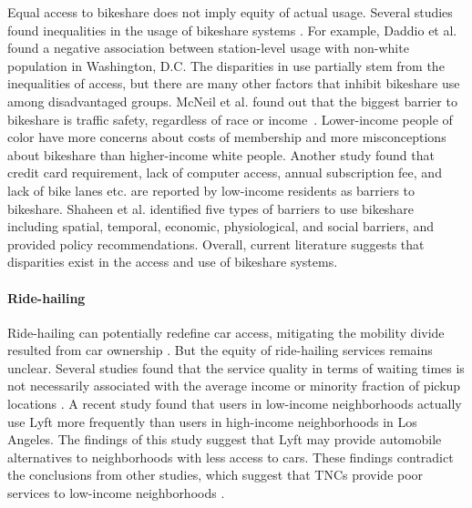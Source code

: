 \documentclass[11pt]{article}
\begin{document}
Equal access to bikeshare does not imply equity of actual usage. Several studies found inequalities in the usage of bikeshare systems \cite{daddio2012maximizing, rixey2013station}. For example, Daddio et al. \cite{daddio2012maximizing} found a negative association between station-level usage with non-white population in Washington, D.C. The disparities in use partially stem from the inequalities of access, but there are many other factors that inhibit bikeshare use among disadvantaged groups. McNeil et al. found out that the biggest barrier to bikeshare is traffic safety, regardless of race or income~\cite{mcneil2017breaking}. Lower-income people of color have more concerns about costs of membership and more misconceptions about bikeshare than higher-income white people. Another study \cite{kretman2011bringing} found that credit card requirement, lack of computer access, annual subscription fee, and lack of bike lanes etc. are reported by low-income residents as barriers to bikeshare. Shaheen et al. \cite{shaheen2017travel} identified five types of barriers to use bikeshare including spatial, temporal, economic, physiological, and social barriers, and provided policy recommendations. Overall, current literature suggests that disparities exist in the access and use of bikeshare systems. 

\paragraph{Ride-hailing}
Ride-hailing can potentially redefine car access, mitigating the mobility divide resulted from car ownership \cite{brown2018ridehail}. But the equity of ride-hailing services remains unclear. Several studies found that the service quality in terms of waiting times is not necessarily associated with the average income or minority fraction of pickup locations \cite{hughes2016transportation, wang2018spatial}. A recent study \cite{brown2018ridehail} found that users in low-income neighborhoods actually use Lyft more frequently than users in high-income neighborhoods in Los Angeles. The findings of this study suggest that Lyft may provide automobile alternatives to neighborhoods with less access to cars. These findings contradict the conclusions from other studies, which suggest that TNCs provide poor services to low-income neighborhoods \cite{stark2016uber}. 
\end{document}
